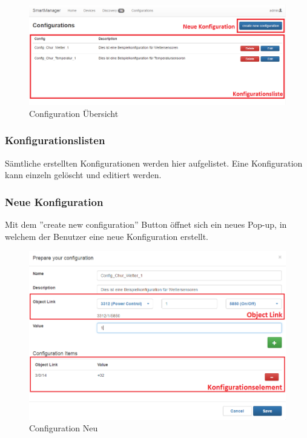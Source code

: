 \begin{figure}[H]
\centering
\includegraphics[scale=0.57]{../04_Realisierung/images/userinterface/config_overview.png}
\caption{Configuration Übersicht}
\end{figure}

\subsubsection{Konfigurationslisten}
Sämtliche erstellten Konfigurationen werden hier aufgelistet. Eine Konfiguration kann einzeln gelöscht und editiert werden.

\subsubsection{Neue Konfiguration}
Mit dem ''create new configuration'' Button öffnet sich ein neues Pop-up, in welchem der Benutzer eine neue Konfiguration erstellt.

\begin{figure}[H]
\centering
\includegraphics[scale=0.7]{../04_Realisierung/images/userinterface/config.png}
\caption{Configuration Neu}
\end{figure}

